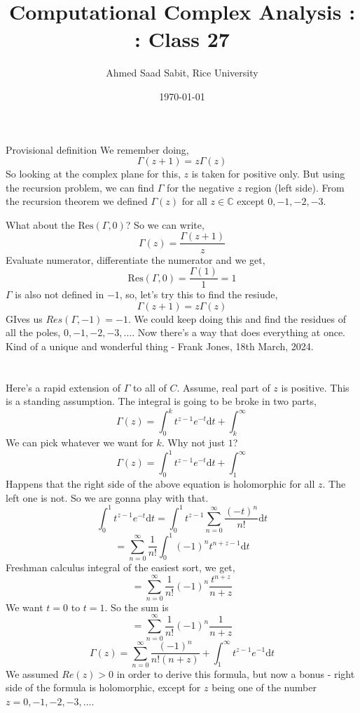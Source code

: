 \documentclass[letter]{article}
\title{Computational Complex Analysis : : Class 27}
\author{Ahmed Saad Sabit, Rice University}
\date{\today}
\begin{document}
\maketitle
Provisional definition 
We remember doing, 
\[
\Gamma (z+1) = z \Gamma (z)
\] So looking at the complex plane for this, $z$ is taken for  positive only. But using the recursion problem, we can find $\Gamma$ for the negative $z$ region (left side). From the recursion theorem we defined $ \Gamma (z)$ for all $z \in \mathbb{C}$ except $0, -1 , -2, -3$.

What about the $\text{Res}(\Gamma, 0)$? So we can write, 
\[
\Gamma(z) = \frac{\Gamma (z+1)}{z}
\]
Evaluate numerator, differentiate the numerator and we get, 
\[
\text{Res}(\Gamma, 0) = \frac{\Gamma (1)}{ 1} = 1
\] 
$\Gamma$ is also not defined in $-1$, so, let's try this to find the resiude, 
\[
\Gamma(z+1) = z \Gamma(z)
\]
GIves us $Res(\Gamma, -1) = -1$. We could keep doing this and find the residues of all the poles, $0, -1, -2, -3, \ldots$. Now there's a way that does everything at once. Kind of a unique and wonderful thing - Frank Jones, 18th March, 2024. 

\section*{}
Here's a rapid extension of $\Gamma$ to all of $C$. Assume, real part of $z$ is positive. This is a standing assumption. The integral is going to be broke in two parts, 
\[
	\Gamma (z) = \int_0^k t ^{z-1} e^{-t} \mathrm{d} t + \int_k^{\infty}
\] 
We can pick whatever we want for $k$. Why not just $1$? 
\[
	\Gamma (z) = \int_0^1 t ^{z-1} e^{-t} \mathrm{d} t + \int_1^{\infty}
\]
Happens that the right side of the above equation is holomorphic for all $z$. The left one is not. So we are gonna play with that. 
\[
\int_0^{1} t ^{z- 1} e^{-t} \mathrm{d}  t = \int_0 ^{1} t ^{z-1} \sum_{n=0}^{\infty} \frac{(-t)^{n}}{n!}\mathrm{d}  t
\]
\[
= \sum_{n=0}^{\infty} \frac{1}{n!} \int_0^{1} (-1)^{n} t ^{n + z - 1} \mathrm{d}  t
\]
Freshman calculus integral of the easiest sort, we get, 
\[
= \sum_{n=0}^{\infty} \frac{1}{n!} (-1)^{n} \frac{ t ^{n+z} }{n+z} 
\] We want $t = 0$ to $t = 1$. So the sum is 
\[
= \sum_{n=0}^{\infty} \frac{1}{n!} (-1)^{n} \frac{1}{n+z}
\] 
\[
\Gamma (z) = \sum_{n=0}^{\infty} \frac{(-1)^{n} }{n! (n+z) } 
+ 
\int_1^{\infty} t ^{z-1} e ^{-1} \mathrm{d} t
\]
We assumed $Re(z) > 0$ in order to derive this formula, but now a bonus - right side of the formula is holomorphic, except for $z$ being one of the number $z = 0 , -1, -2, -3, \ldots$.  
 
\end{document}
